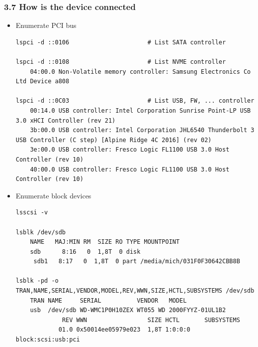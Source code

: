 \begin{frame}[fragile]
  \frametitle{3.7 How is the device connected}
    \begin{itemize}
        \item Enumerate PCI bus
\begin{lstlisting}[basicstyle=\tiny]
lspci -d ::0106                      # List SATA controller

lspci -d ::0108                      # List NVME controller
    04:00.0 Non-Volatile memory controller: Samsung Electronics Co Ltd Device a808

lspci -d ::0C03                      # List USB, FW, ... controller
    00:14.0 USB controller: Intel Corporation Sunrise Point-LP USB 3.0 xHCI Controller (rev 21)
    3b:00.0 USB controller: Intel Corporation JHL6540 Thunderbolt 3 USB Controller (C step) [Alpine Ridge 4C 2016] (rev 02)
    3e:00.0 USB controller: Fresco Logic FL1100 USB 3.0 Host Controller (rev 10)
    40:00.0 USB controller: Fresco Logic FL1100 USB 3.0 Host Controller (rev 10)
\end{lstlisting}
        \item Enumerate block devices
\begin{lstlisting}[basicstyle=\tiny]
lsscsi -v

lsblk /dev/sdb
    NAME   MAJ:MIN RM  SIZE RO TYPE MOUNTPOINT
    sdb      8:16   0  1,8T  0 disk
     sdb1   8:17   0  1,8T  0 part /media/mich/031F0F30642CBB8B

lsblk -pd -o TRAN,NAME,SERIAL,VENDOR,MODEL,REV,WWN,SIZE,HCTL,SUBSYSTEMS /dev/sdb
    TRAN NAME     SERIAL          VENDOR   MODEL
    usb  /dev/sdb WD-WMC1P0H10ZEX WT055 WD 2000FYYZ-01UL1B2
             REV WWN                 SIZE HCTL       SUBSYSTEMS
            01.0 0x50014ee05979e023  1,8T 1:0:0:0    block:scsi:usb:pci
\end{lstlisting}
    \end{itemize}
\end{frame}


